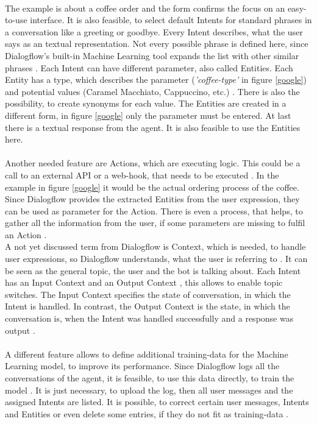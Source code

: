 \documentclass[10pt,final,journal,a4paper,oneside,twocolumn]{IEEEtran}
\begin{document}
\\The example is about a coffee order and the form confirms the focus on an easy-to-use interface. It is also feasible, to select default Intents for standard phrases in a conversation like a greeting or goodbye. Every Intent describes, what the user says as an textual representation. Not every possible phrase is defined here, since Dialogflow's built-in Machine Learning tool expands the list with other similar phrases \cite{b24}. Each Intent can have different parameter, also called Entities. Each Entity has a type, which describes the parameter (\textit{'coffee-type'} in figure \ref{google}) and potential values (Caramel Macchiato, Cappuccino, etc.) \cite{b24}. There is also the possibility, to create synonyms for each value. The Entities are created in a different form, in figure \ref{google} only the parameter must be entered. At last there is a textual response from the agent. It is also feasible to use the Entities here. \\
\\
Another needed feature are Actions, which are executing logic. This could be a call to an external API or a web-hook, that needs to be executed \cite{b24}. In the example in figure \ref{google} it would be the actual ordering process of the coffee. Since Dialogflow provides the extracted Entities from the user expression, they can be used as parameter for the Action. There is even a process, that helps, to gather all the information from the user, if some parameters are missing to fulfil an Action \cite{b24}.\\
A not yet discussed term from Dialogflow is Context, which is needed, to handle user expressions, so Dialogflow understands, what the user is referring to \cite{b25}. It can be seen as the general topic, the user and the bot is talking about. Each Intent has an Input Context and an Output Context \cite{b25}, this allows to enable topic switches. The Input Context specifies the state of conversation, in which the Intent is handled. In contrast, the Output Context is the state, in which the conversation is, when the Intent was handled successfully and a response was output \cite{b25}.\\
\\
A different feature allows to define additional training-data for the Machine Learning model, to improve its performance. Since Dialogflow logs all the conversations of the agent, it is feasible, to use this data directly, to train the model \cite{b24}. It is just necessary, to upload the log, then all user messages and the assigned Intents are listed. It is possible, to correct certain user messages, Intents and Entities or even delete some entries, if they do not fit as training-data \cite{b24}.\\
\end{document}

